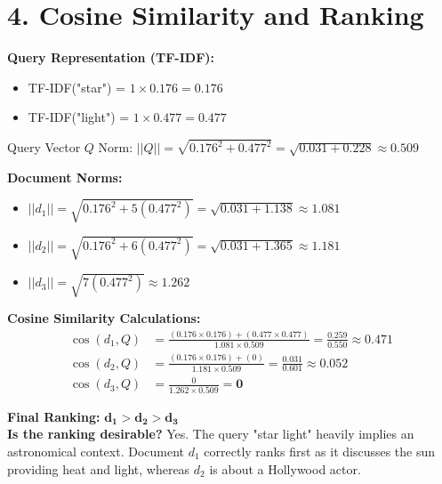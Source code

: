 \documentclass{article}
\begin{document}
\section*{4. Cosine Similarity and Ranking}
\textbf{Query Representation (TF-IDF):}
\begin{itemize}
    \item TF-IDF("star") = $1 \times 0.176 = 0.176$
    \item TF-IDF("light") = $1 \times 0.477 = 0.477$
\end{itemize}
Query Vector $Q$ Norm: $||Q|| = \sqrt{0.176^2 + 0.477^2} = \sqrt{0.031 + 0.228} \approx 0.509$

\vspace{1em}
\textbf{Document Norms:}
\begin{itemize}
    \item $||d_1|| = \sqrt{0.176^2 + 5(0.477^2)} = \sqrt{0.031 + 1.138} \approx 1.081$
    \item $||d_2|| = \sqrt{0.176^2 + 6(0.477^2)} = \sqrt{0.031 + 1.365} \approx 1.181$
    \item $||d_3|| = \sqrt{7(0.477^2)} \approx 1.262$
\end{itemize}

\vspace{1em}
\textbf{Cosine Similarity Calculations:}
\begin{align*}
\cos(d_1, Q) &= \frac{(0.176 \times 0.176) + (0.477 \times 0.477)}{1.081 \times 0.509} = \frac{0.259}{0.550} \approx \mathbf{0.471} \\
\cos(d_2, Q) &= \frac{(0.176 \times 0.176) + (0)}{1.181 \times 0.509} = \frac{0.031}{0.601} \approx \mathbf{0.052} \\
\cos(d_3, Q) &= \frac{0}{1.262 \times 0.509} = \mathbf{0}
\end{align*}

\textbf{Final Ranking:} $\mathbf{d_1 > d_2 > d_3}$ \\
\textbf{Is the ranking desirable?} Yes. The query "star light" heavily implies an astronomical context. Document $d_1$ correctly ranks first as it discusses the sun providing heat and light, whereas $d_2$ is about a Hollywood actor. 
\end{document}
